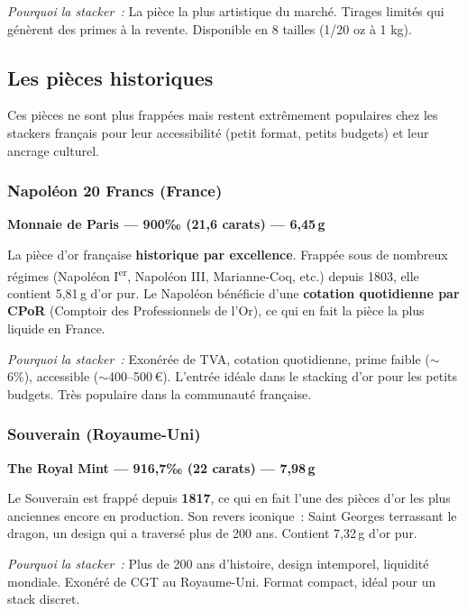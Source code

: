 \documentclass[14pt,a4paper]{extarticle}
\newcommand{\permil}{‰}
\begin{document}
\textit{Pourquoi la stacker~:} La pièce la plus artistique du marché. Tirages limités qui génèrent des primes à la revente. Disponible en 8 tailles (1/20 oz à 1 kg).


\newpage

\subsection{Les pièces historiques}

Ces pièces ne sont plus frappées mais restent extrêmement populaires chez les stackers français pour leur accessibilité (petit format, petits budgets) et leur ancrage culturel.

\subsubsection{Napoléon 20 Francs (France)}

\textbf{Monnaie de Paris --- 900\permil{} (21,6 carats) --- 6,45\,g}

La pièce d'or française \textbf{historique par excellence}. Frappée sous de nombreux régimes (Napoléon I\textsuperscript{er}, Napoléon III, Marianne-Coq, etc.) depuis 1803, elle contient 5,81\,g d'or pur. Le Napoléon bénéficie d'une \textbf{cotation quotidienne par CPoR} (Comptoir des Professionnels de l'Or), ce qui en fait la pièce la plus liquide en France.

\textit{Pourquoi la stacker~:} Exonérée de TVA, cotation quotidienne, prime faible ($\sim$6\%), accessible ($\sim$400--500\,€). L'entrée idéale dans le stacking d'or pour les petits budgets. Très populaire dans la communauté française.

\subsubsection{Souverain (Royaume-Uni)}

\textbf{The Royal Mint --- 916,7\permil{} (22 carats) --- 7,98\,g}

Le Souverain est frappé depuis \textbf{1817}, ce qui en fait l'une des pièces d'or les plus anciennes encore en production. Son revers iconique~: Saint Georges terrassant le dragon, un design qui a traversé plus de 200 ans. Contient 7,32\,g d'or pur.

\textit{Pourquoi la stacker~:} Plus de 200 ans d'histoire, design intemporel, liquidité mondiale. Exonéré de CGT au Royaume-Uni. Format compact, idéal pour un stack discret.
\end{document}
